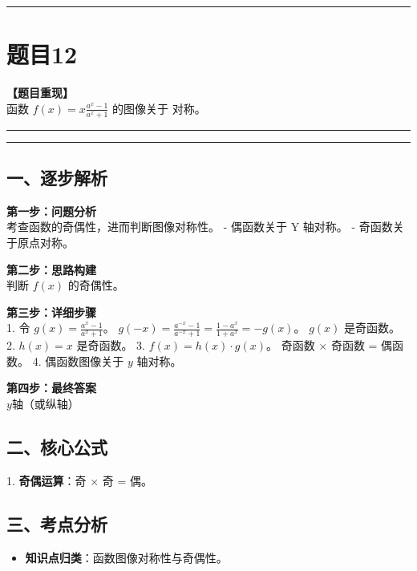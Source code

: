 \documentclass[12pt, a4paper]{ctexart}
\newcommand{\TopSeparator}{
    \par\noindent\rule{\textwidth}{1.5pt}\vspace{0.5em} %
}
\newcommand{\AnalysisSeparator}{
    \par\noindent\rule{\textwidth}{0.5pt}\vspace{0.2em}\hrule\vspace{0.5em} %
}
\newenvironment{RedAnalysis}{
    \par
    \color{red} %
}{
    \par
    \color{black} %
}
\begin{document}
\vspace{2em}

\TopSeparator
\section*{题目12}

\textbf{【题目重现】} \\
函数 $ f(x) = x \frac{a^{x}-1}{a^{x}+1} $ 的图像关于 \underline{\hspace{2cm}} 对称。

\AnalysisSeparator

\begin{RedAnalysis}

\subsection*{一、逐步解析}

\textbf{第一步：问题分析} \\
考查函数的奇偶性，进而判断图像对称性。
- 偶函数关于 Y 轴对称。
- 奇函数关于原点对称。

\textbf{第二步：思路构建} \\
判断 $f(x)$ 的奇偶性。

\textbf{第三步：详细步骤} \\
1. 令 $g(x) = \frac{a^x-1}{a^x+1}$。
   $g(-x) = \frac{a^{-x}-1}{a^{-x}+1} = \frac{1-a^x}{1+a^x} = -g(x)$。
   $g(x)$ 是奇函数。
2. $h(x) = x$ 是奇函数。
3. $f(x) = h(x) \cdot g(x)$。
   奇函数 $\times$ 奇函数 = 偶函数。
4. 偶函数图像关于 $y$ 轴对称。

\textbf{第四步：最终答案} \\
$y$轴（或纵轴）

\subsection*{二、核心公式}
1. \textbf{奇偶运算}：奇 $\times$ 奇 = 偶。

\subsection*{三、考点分析}
\begin{itemize}
    \item \textbf{知识点归类}：函数图像对称性与奇偶性。
\end{itemize}

\end{RedAnalysis}

\vspace{2em}
\end{document}
